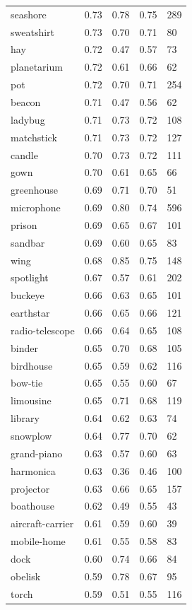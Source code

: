 \begin{center}
\begin{longtable}{lllll}
seashore & 0.73 & 0.78 & 0.75 & 289 \\
sweatshirt & 0.73 & 0.70 & 0.71 & 80 \\
hay & 0.72 & 0.47 & 0.57 & 73 \\
planetarium & 0.72 & 0.61 & 0.66 & 62 \\
pot & 0.72 & 0.70 & 0.71 & 254 \\
beacon & 0.71 & 0.47 & 0.56 & 62 \\
ladybug & 0.71 & 0.73 & 0.72 & 108 \\
matchstick & 0.71 & 0.73 & 0.72 & 127 \\
candle & 0.70 & 0.73 & 0.72 & 111 \\
gown & 0.70 & 0.61 & 0.65 & 66 \\
greenhouse & 0.69 & 0.71 & 0.70 & 51 \\
microphone & 0.69 & 0.80 & 0.74 & 596 \\
prison & 0.69 & 0.65 & 0.67 & 101 \\
sandbar & 0.69 & 0.60 & 0.65 & 83 \\
wing & 0.68 & 0.85 & 0.75 & 148 \\
spotlight & 0.67 & 0.57 & 0.61 & 202 \\
buckeye & 0.66 & 0.63 & 0.65 & 101 \\
earthstar & 0.66 & 0.65 & 0.66 & 121 \\
radio-telescope & 0.66 & 0.64 & 0.65 & 108 \\
binder & 0.65 & 0.70 & 0.68 & 105 \\
birdhouse & 0.65 & 0.59 & 0.62 & 116 \\
bow-tie & 0.65 & 0.55 & 0.60 & 67 \\
limousine & 0.65 & 0.71 & 0.68 & 119 \\
library & 0.64 & 0.62 & 0.63 & 74 \\
snowplow & 0.64 & 0.77 & 0.70 & 62 \\
grand-piano & 0.63 & 0.57 & 0.60 & 63 \\
harmonica & 0.63 & 0.36 & 0.46 & 100 \\
projector & 0.63 & 0.66 & 0.65 & 157 \\
boathouse & 0.62 & 0.49 & 0.55 & 43 \\
aircraft-carrier & 0.61 & 0.59 & 0.60 & 39 \\
mobile-home & 0.61 & 0.55 & 0.58 & 83 \\
dock & 0.60 & 0.74 & 0.66 & 84 \\
obelisk & 0.59 & 0.78 & 0.67 & 95 \\
torch & 0.59 & 0.51 & 0.55 & 116 \\

\end{longtable}
\end{center}
